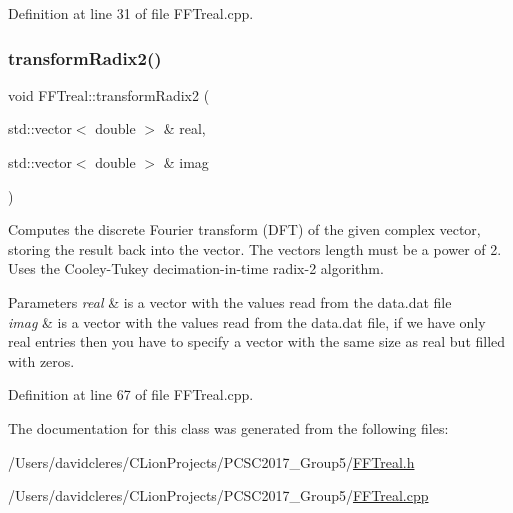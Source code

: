 Definition at line 31 of file F\+F\+Treal.\+cpp.

\mbox{\label{class_f_f_treal_afa3f0e3c25513ee26c9698b864330df9}} 
\subsubsection{\texorpdfstring{transform\+Radix2()}{transformRadix2()}}
{\footnotesize\ttfamily void F\+F\+Treal\+::transform\+Radix2 (\begin{DoxyParamCaption}\item[{std\+::vector$<$ double $>$ \&}]{real,  }\item[{std\+::vector$<$ double $>$ \&}]{imag }\end{DoxyParamCaption})}



Computes the discrete Fourier transform (D\+FT) of the given complex vector, storing the result back into the vector. The vector\textquotesingle{}s length must be a power of 2. Uses the Cooley-\/\+Tukey decimation-\/in-\/time radix-\/2 algorithm. 


\begin{DoxyParams}{Parameters}
{\em real} & is a vector with the values read from the data.\+dat file \\
\hline
{\em imag} & is a vector with the values read from the data.\+dat file, if we have only real entries then you have to specify a vector with the same size as real but filled with zeros. \\
\hline
\end{DoxyParams}


Definition at line 67 of file F\+F\+Treal.\+cpp.



The documentation for this class was generated from the following files\+:\begin{DoxyCompactItemize}
\item 
/\+Users/davidcleres/\+C\+Lion\+Projects/\+P\+C\+S\+C2017\+\_\+\+Group5/\mbox{\hyperlink{_f_f_treal_8h}{F\+F\+Treal.\+h}}\item 
/\+Users/davidcleres/\+C\+Lion\+Projects/\+P\+C\+S\+C2017\+\_\+\+Group5/\mbox{\hyperlink{_f_f_treal_8cpp}{F\+F\+Treal.\+cpp}}\end{DoxyCompactItemize}

